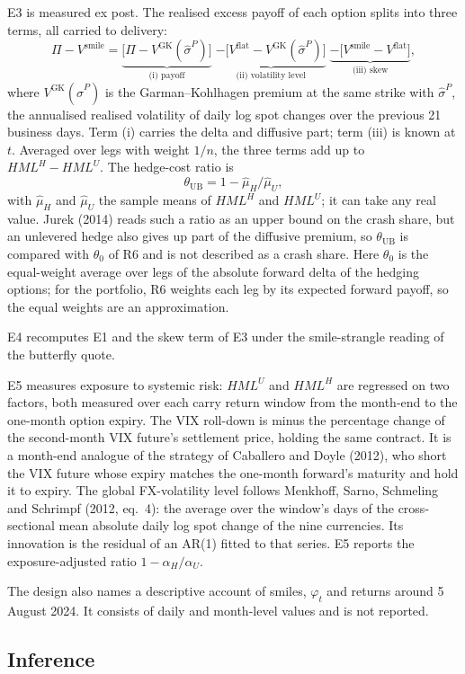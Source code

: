 \documentclass[11pt]{article}
\theoremstyle{result}
\newcommand{\HML}{\mathit{HML}}
\newcommand{\Vsmile}{V^{\mathrm{smile}}}
\newcommand{\Vflat}{V^{\mathrm{flat}}}
\newcommand{\VGK}{V^{\mathrm{GK}}}
\newcommand{\thUB}{\theta_{\mathrm{UB}}}
\newcommand{\sigP}{\hat\sigma^{P}}
\begin{document}
E3 is measured ex post. The realised excess payoff of each option splits into three terms, all carried to delivery:
\[
\Pi-\Vsmile=\underbrace{\bigl[\Pi-\VGK(\sigP)\bigr]}_{\text{(i) payoff}}\;\underbrace{-\bigl[\Vflat-\VGK(\sigP)\bigr]}_{\text{(ii) volatility level}}\;\underbrace{-\bigl[\Vsmile-\Vflat\bigr]}_{\text{(iii) skew}},
\]
where $\VGK(\sigP)$ is the Garman--Kohlhagen premium at the same strike with $\sigP$, the annualised realised volatility of daily log spot changes over the previous 21 business days. Term (i) carries the delta and diffusive part; term (iii) is known at $t$. Averaged over legs with weight $1/n$, the three terms add up to $\HML^H-\HML^U$. The hedge-cost ratio is
\[
\thUB=1-\hat\mu_H/\hat\mu_U,
\]
with $\hat\mu_H$ and $\hat\mu_U$ the sample means of $\HML^H$ and $\HML^U$; it can take any real value. Jurek (2014) reads such a ratio as an upper bound on the crash share, but an unlevered hedge also gives up part of the diffusive premium, so $\thUB$ is compared with $\theta_0$ of R6 and is not described as a crash share. Here $\theta_0$ is the equal-weight average over legs of the absolute forward delta of the hedging options; for the portfolio, R6 weights each leg by its expected forward payoff, so the equal weights are an approximation.

E4 recomputes E1 and the skew term of E3 under the smile-strangle reading of the butterfly quote.

E5 measures exposure to systemic risk: $\HML^U$ and $\HML^H$ are regressed on two factors, both measured over each carry return window from the month-end to the one-month option expiry. The VIX roll-down is minus the percentage change of the second-month VIX future's settlement price, holding the same contract. It is a month-end analogue of the strategy of Caballero and Doyle (2012), who short the VIX future whose expiry matches the one-month forward's maturity and hold it to expiry. The global FX-volatility level follows Menkhoff, Sarno, Schmeling and Schrimpf (2012, eq.~4): the average over the window's days of the cross-sectional mean absolute daily log spot change of the nine currencies. Its innovation is the residual of an AR(1) fitted to that series. E5 reports the exposure-adjusted ratio $1-\alpha_H/\alpha_U$.

The design also names a descriptive account of smiles, $\varphi_t$ and returns around 5 August 2024. It consists of daily and month-level values and is not reported.

\subsection{Inference}
\end{document}
